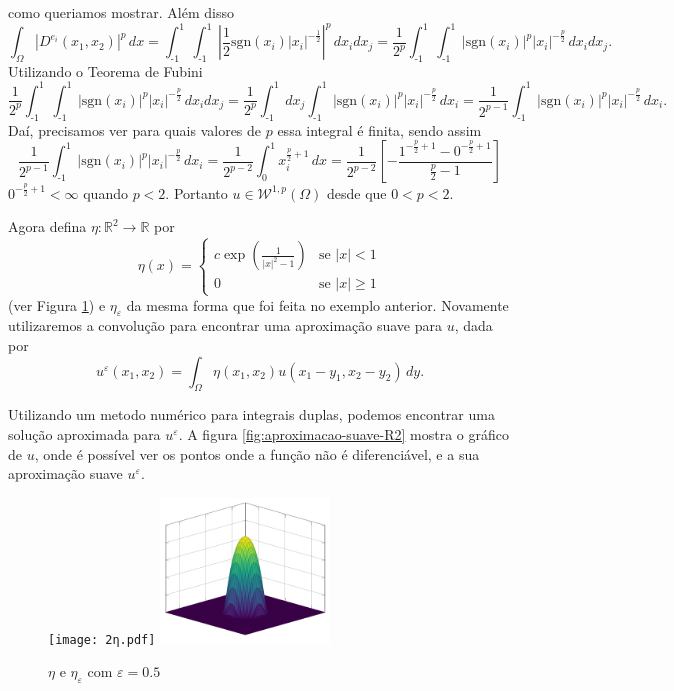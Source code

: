 \documentclass[a4paper, 11pt]{book}
\theoremstyle{definition}
\newcommand{\bR}{\mathbb{R}}
\newcommand{\cW}{\mathcal{W}}
\newcommand{\sgn}{\mathrm{sgn}}
\begin{document}
\begin{ex}
\[    \]
    como queriamos mostrar.
    Além disso
    \[
        \int_\Omega |D^{e_i} (x_1,x_2)|^p \, dx = \int_{\text{-}1}^1 \int_{\text{-}1}^1 \left| \frac{1}{2} \sgn(x_i) |x_i|^{-\frac{1}{2}} \right|^p \, dx_i dx_j = \frac{1}{2^p}\int_{\text{-}1}^1 \int_{\text{-}1}^1 |\sgn(x_i)|^p |x_i|^{-\frac{p}{2}} \,dx_i dx_j.
    \]
    Utilizando o Teorema de Fubini
    {\small
    \[
        \frac{1}{2^p}\int_{\text{-}1}^1\int_{\text{-}1}^1 |\sgn(x_i)|^p |x_i|^{-\frac{p}{2}} \,dx_i dx_j = \frac{1}{2^p}\int_{\text{-}1}^1 dx_j \int_{\text{-}1}^1 |\sgn(x_i)|^p |x_i|^{-\frac{p}{2}} \,dx_i = \frac{1}{2^{p-1}} \int_{\text{-}1}^1 |\sgn(x_i)|^p |x_i|^{-\frac{p}{2}} \,dx_i.
    \]}
    Daí, precisamos ver para quais valores de $p$ essa integral é finita, sendo assim
    \[
        \frac{1}{2^{p-1}} \int_{\text{-}1}^1 |\sgn(x_i)|^p |x_i|^{-\frac{p}{2}} \,dx_i = \frac{1}{2^{p-2}}\int_0^1 x_i^{\frac{p}{2}+1} \,dx = \frac{1}{2^{p-2}} \left[ -\frac{1^{-\frac{p}{2}+1} - 0^{-\frac{p}{2}+1}}{\tfrac{p}{2} - 1} \right]
    \]
    $0^{-\frac{p}{2} + 1} < \infty$ quando $p < 2$. Portanto $u \in \cW^{1,p}(\Omega)$ desde que $0 < p < 2$.

    Agora defina $\eta: \bR^2 \to \bR$ por
    \[
        \eta(x) = 
        \left\{ 
            \begin{array}{lr}
                c \exp\left(\frac{1}{|x|^2 - 1} \right) & \text{se } |x| < 1\\
                0 & \text{se } |x| \geqslant 1
            \end{array}
        \right.
    \]
    (ver Figura \ref{fig:eta-R2}) e $\eta_\varepsilon$ da mesma forma que foi feita no exemplo anterior. Novamente utilizaremos a convolução para encontrar uma aproximação suave para $u$, dada por
    \[
        u^{\varepsilon}(x_1,x_2) = \int_\Omega \eta(x_1,x_2) u(x_1 - y_1, x_2 - y_2) \,dy.
    \]

    Utilizando um metodo numérico para integrais duplas, podemos encontrar uma solução aproximada para $u^\varepsilon$.
    A figura \ref{fig:aproximacao-suave-R2} mostra o gráfico de $u$, onde é possível ver os pontos onde a função não é diferenciável, e a sua aproximação suave $u^\varepsilon$.

    \begin{figure}
        \centering
        \texttt{[image: 2η.pdf]}
        \hspace{10mm}
        \includegraphics[width=0.4\textwidth]{2ηε.pdf}
        \caption{$\eta$ e $\eta_\varepsilon$ com $\varepsilon = 0.5$}
        \label{fig:eta-R2}
    \end{figure}


\end{ex}
\end{document}
